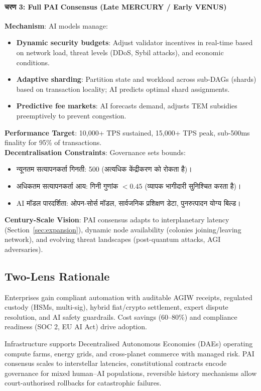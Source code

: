 \documentclass[11pt]{article}
\begin{document}
\paragraph{चरण 3: Full PAI Consensus (Late MERCURY / Early VENUS)}
\textbf{Mechanism}: AI models manage:
\begin{itemize}[noitemsep]
  \item \textbf{Dynamic security budgets}: Adjust validator incentives in real-time based on network load, threat levels (DDoS, Sybil attacks), and economic conditions.
  \item \textbf{Adaptive sharding}: Partition state and workload across sub-DAGs (shards) based on transaction locality; AI predicts optimal shard assignments.
  \item \textbf{Predictive fee markets}: AI forecasts demand, adjusts TEM subsidies preemptively to prevent congestion.
\end{itemize}
\textbf{Performance Target}: 10,000+ TPS sustained, 15,000+ TPS peak, sub-500ms finality for 95\% of transactions.\\
\textbf{Decentralisation Constraints}: Governance sets bounds:
\begin{itemize}[noitemsep]
  \item न्यूनतम सत्यापनकर्ता गिनती: 500 (अत्यधिक केंद्रीकरण को रोकता है)।
  \item अधिकतम सत्यापनकर्ता आय: गिनी गुणांक $<0.45$ (व्यापक भागीदारी सुनिश्चित करता है)।
  \item AI मॉडल पारदर्शिता: ओपन-सोर्स मॉडल, सार्वजनिक प्रशिक्षण डेटा, पुनरुत्पादन योग्य बिल्ड।
\end{itemize}
\textbf{Century-Scale Vision}: PAI consensus adapts to interplanetary latency (Section~\ref{sec:expansion}), dynamic node availability (colonies joining/leaving network), and evolving threat landscapes (post-quantum attacks, AGI adversaries).

\subsection{Two-Lens Rationale}
\begin{description}[style=nextline]
  \item[Near-Term (MERCURY Era)] Enterprises gain compliant automation with auditable AGIW receipts, regulated custody (HSMs, multi-sig), hybrid fiat/crypto settlement, expert dispute resolution, and AI safety guardrails. Cost savings (60--80\%) and compliance readiness (SOC 2, EU AI Act) drive adoption.
  \item[Century-Scale (VENUS through ANDROMEDA)] Infrastructure supports Decentralised Autonomous Economies (DAEs) operating compute farms, energy grids, and cross-planet commerce with managed risk. PAI consensus scales to interstellar latencies, constitutional contracts encode governance for mixed human--AI populations, reversible history mechanisms allow court-authorised rollbacks for catastrophic failures.
\end{description}
\end{document}
